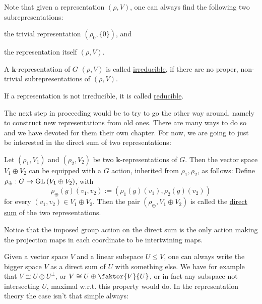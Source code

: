 Note that given a representation $(\rho,V)$, one can always find the following two subrepresentations:
\begin{i_enum}
\item the trivial representation $(\rho_0,\{0\})$, and
\item the representation itself $(\rho,V)$.
\end{i_enum}

\begin{definition} A $\mathbf{k}$-representation of $G$ $(\rho,V)$ is called \ul{irreducible}, if there are no proper, non-trivial subrepresentations of $(\rho,V)$.

If a representation is not irreducible, it is called \ul{reducible}.
\end{definition}

The next step in proceeding would be to try to go the other way around, namely to construct new representations from old ones. There are many ways to do so and we have devoted for them their own chapter. For now, we are going to just be interested in the direct sum of two representations:

\begin{definition} Let $(\rho_1,V_1)$ and $(\rho_2,V_2)$ be two $\mathbf{k}$-representations of $G$. Then the vector space $V_1\oplus V_2$ can be equipped with a $G$ action, inherited from $\rho_1,\rho_2$, as follows: Define $\rho_{\oplus}:G\to\GL{V_1\oplus V_2}$, with
$$\rho_{\oplus}(g)(v_1,v_2):=(\rho_1(g)(v_1),\rho_2(g)(v_2))$$
for every $(v_1,v_2)\in V_1\oplus V_2$. Then the pair $(\rho_{\oplus},V_1\oplus V_2)$ is called the \ul{direct sum} of the two representations.
\end{definition}

Notice that the imposed group action on the direct sum is the only action making the projection maps in each coordinate to be intertwining maps.

Given a vector space $V$ and a linear subspace $U\leq V$, one can always write the bigger space $V$ as a direct sum of $U$ with something else. We have for example that $V\cong U\oplus U^{\perp}$, or $V\cong U\oplus\faktor{V}{U}$, or in fact any subspace not intersecting $U$, maximal w.r.t. this property would do. In the representation theory the case isn't that simple always:

